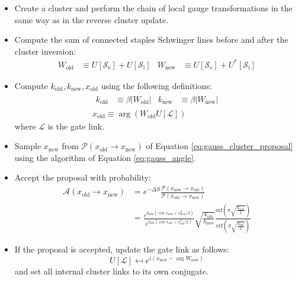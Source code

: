 \begin{itemize}
    \item
        Create a cluster and perform the chain of local gauge transformations in the same way as in the reverse cluster update.
    \item
        Compute the sum of connected staples Schwinger lines before and after the cluster inversion:
        \[\begin{aligned}
            W_\mathrm{old} &\equiv U[\mathcal S_\mathrm{e}] + U[\mathcal S_\mathrm{i}] &
            W_\mathrm{new} &\equiv U[\mathcal S_\mathrm{e}] + U^*[\mathcal S_\mathrm{i}]
        \end{aligned}\]
    \item
        Compute $k_\mathrm{old}, k_\mathrm{new}, x_\mathrm{old}$ using the following definitions:
        \[\begin{gathered}
            \begin{aligned}
                k_\mathrm{old} &\equiv \beta|W_\mathrm{old}| & k_\mathrm{new} &\equiv \beta|W_\mathrm{new}|
            \end{aligned}\\
            x_\mathrm{old} \equiv \arg(W_\mathrm{old}U[\mathcal L])
        \end{gathered}\]
        where $\mathcal L$ is the gate link.
    \item
        Sample $x_\mathrm{new}$ from $\mathcal P(x_\mathrm{old}\to x_\mathrm{new})$ of Equation \eqref{eq:gauss_cluster_proposal}
        using the algorithm of Equation \eqref{eq:gauss_angle}.
    \item
        Accept the proposal with probability:
        \[\begin{aligned}
            \mathcal A(x_\mathrm{old}\to x_\mathrm{new}) &= e^{-\Delta S}\frac{\mathcal P(x_\mathrm{new}\to x_\mathrm{old})}{\mathcal P(x_\mathrm{old}\to x_\mathrm{new})} \\
            &= \frac{e^{k_\mathrm{new}(\cos x_\mathrm{new}+x_\mathrm{new}^2/2)}}{e^{k_\mathrm{old}(\cos x_\mathrm{old}+x_\mathrm{old}^2/2)}}
              \sqrt{\frac{k_\mathrm{old}}{k_\mathrm{new}}}\frac{\mathrm{erf}\left(\pi\sqrt{\frac{k_\mathrm{new}}{2}}\right)}{\mathrm{erf}\left(\pi\sqrt{\frac{k_\mathrm{old}}{2}}\right)}
        \end{aligned}\]
    \item
        If the proposal is accepted, update the gate link as follows:
        \[
            U[\mathcal L] \mapsfrom e^{i(x_\mathrm{new}-\arg W_\mathrm{new})}
        \]
        and set all internal cluster links to its own conjugate.
\end{itemize}

